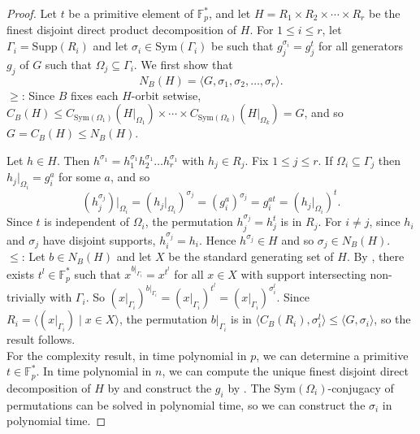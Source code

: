 \documentclass[11pt,a4paper]{article}
\theoremstyle{definition}
\theoremstyle{remark}
\newcommand{\Sym}[0]{\mathrm{Sym}}
\newcommand{\factor}{R}
\newcommand{\Supp}{\mathrm{Supp}}
\begin{document}
\begin{proof}
Let $t$ be a primitive element of $\mathds{F}_p^*$, and 
let $H = \factor_1 \times \factor_2 \times \cdots \times \factor_r$ be the finest disjoint direct product decomposition of $H$. 
For $1 \leq i \leq r$, let $\Gamma_i = \Supp(R_i)$ and let $\sigma_i \in \Sym(\Gamma_i)$ be such that $g_j^{\sigma_i} = g_j^{t}$ for all generators $g_j$ of $G$ such that $\Omega_j \subseteq \Gamma_i$. We first show that
\begin{equation*} \label{eqn: NBH}
    N_{B}(H) = \langle G, \sigma_1, \sigma_2, \ldots , \sigma_r \rangle. 
\end{equation*}
$\geq$: 
Since $B$ fixes each $H$-orbit setwise, $C_B(H) \leq C_{\Sym(\Omega_1)}(H|_{\Omega_1}) \times \cdots \times C_{\Sym(\Omega_k)}(H|_{\Omega_k}) = G$, and so $G = C_B(H)\leq N_B(H)$. 

Let $h \in H$. Then $h^{\sigma_1} = h_1^{\sigma_1} h_2^{\sigma_1} \ldots h_r^{\sigma_1}$ with $h_j \in R_j$. Fix $1 \leq j \leq r$.
If $\Omega_i \subseteq \Gamma_j$ then $h_j|_{\Omega_i} = g_i^{a}$ for some $a$, and so \[
(h_j^{\sigma_j})|_{\Omega_i} = (h_j|_{\Omega_i})^{\sigma_j} = (g_i^{a})^{\sigma_j} = g_i^{a t} = (h_j|_{\Omega_i})^t.
\]
Since $t$ is independent of $\Omega_i$, the permutation $h_j^{\sigma_j} = h_j^t$ is in $R_j$. 
For $i \neq j$, since $h_i$ and $\sigma_j$ have disjoint supports, $h_i^{\sigma_j} = h_i$. 
Hence $h^{\sigma_j} \in H$ and so $\sigma_j \in N_B(H)$.  \\
$\leq$: 
Let $b \in N_B(H)$ and let $X$ be the standard generating set of $H$. 
By , there exists $t^l \in \mathds{F}_p^*$ such that $x^{b|_{\Gamma_i}} = x^{t^l}$ for all $x \in X$ with support intersecting non-trivially with $\Gamma_i$. 
So $(x|_{\Gamma_i})^{b|_{\Gamma_i}} = (x|_{\Gamma_i})^{t^l} = (x|_{\Gamma_i})^{\sigma_i^l}$. 
Since $R_i = \langle (x|_{\Gamma_i}) \mid x \in X \rangle$, the permutation $b|_{\Gamma_i}$ is in $\langle C_{B}(R_i) , \sigma_i^l \rangle \leq \langle G, \sigma_i \rangle$, so the result follows.  \medskip \\
For the complexity result, in time polynomial in $p$, we can determine a primitive $t \in \mathds{F}_p^*$. In time polynomial in $n$, we can compute the unique finest disjoint direct decomposition of $H$ by \cite{DDPD} and construct the $g_i$ by . 
The $\Sym(\Omega_i)$-conjugacy of permutations can be solved in polynomial time, so we can construct the $\sigma_i$ in polynomial time. 
\end{proof}
\end{document}
